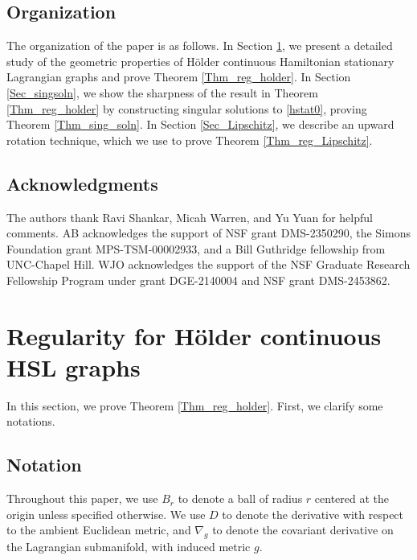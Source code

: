 \documentclass[12pt,reqno]{amsart}%
\theoremstyle{plain}
\numberwithin{equation}{section}
\theoremstyle{definition}
\theoremstyle{remark}
\begin{document}
\subsection*{Organization}The organization of the paper is as follows. In Section \ref{Sec_Holder}, we present a detailed study of the geometric properties of Hölder continuous Hamiltonian stationary Lagrangian graphs and prove Theorem \ref{Thm_reg_holder}. In Section \ref{Sec_singsoln}, we show the sharpness of the result in Theorem \ref{Thm_reg_holder} by constructing singular solutions to \eqref{hstat0}, proving Theorem \ref{Thm_sing_soln}. In Section \ref{Sec_Lipschitz}, we describe an upward rotation technique, which we use to prove Theorem \ref{Thm_reg_Lipschitz}. 





\medskip

 \subsection*{Acknowledgments} The authors thank Ravi Shankar, Micah Warren, and Yu Yuan for helpful comments. 
AB acknowledges
the support of NSF grant DMS-2350290, the Simons Foundation grant MPS-TSM-00002933, and a Bill Guthridge fellowship from UNC-Chapel Hill. WJO acknowledges the support of the NSF Graduate Research Fellowship Program under grant DGE-2140004 and NSF grant DMS-2453862.












\section{Regularity for H\"older continuous HSL graphs}
\label{Sec_Holder}



In this section, we prove Theorem \ref{Thm_reg_holder}.
First, we clarify some notations.


\subsection*{Notation}Throughout this paper, we use $B_r$ to denote a ball of radius $r$ centered at the origin unless specified otherwise. We use $D$ to denote the derivative with respect to the ambient Euclidean metric, and $\nabla_g$ to denote the covariant derivative on the Lagrangian submanifold, with induced metric $g$. 
\end{document}
